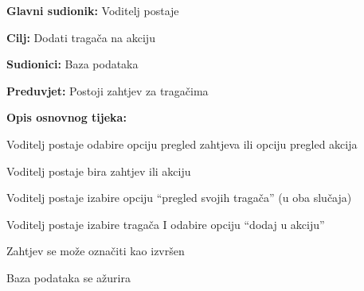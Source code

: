 					\noindent {}
					\begin{packed_item}
	
						\item \textbf{Glavni sudionik: }  Voditelj postaje
						\item  \textbf{Cilj:} Dodati tragača na akciju
						\item  \textbf{Sudionici:} Baza podataka
						\item  \textbf{Preduvjet:}  Postoji zahtjev za tragačima
						\item  \textbf{Opis osnovnog tijeka:} 
						
						
						\item[] \begin{packed_enum}
	
							\item Voditelj postaje odabire opciju pregled zahtjeva ili opciju pregled akcija 
							\item Voditelj postaje bira zahtjev ili akciju	
							\item Voditelj postaje izabire opciju “pregled svojih tragača” (u oba slučaja)
							\item Voditelj postaje izabire tragača I odabire opciju “dodaj u akciju”
							\item Zahtjev se može označiti kao izvršen 
							\item Baza podataka se ažurira
						\end{packed_enum}
					\end{packed_item}



